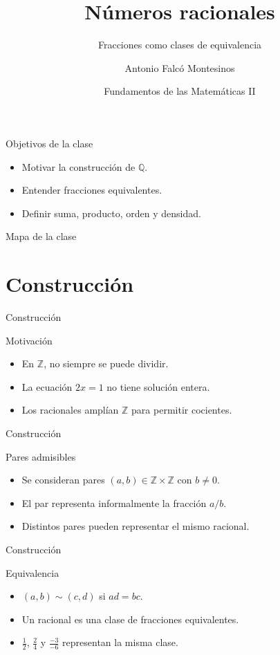 \documentclass[aspectratio=169,11pt]{beamer}
\title[FdM II -- Clase 12]{Números racionales}
\subtitle{Fracciones como clases de equivalencia}
\author{Antonio Falcó Montesinos}
\institute{Universidad CEU Cardenal Herrera}
\date{Fundamentos de las Matemáticas II}
\begin{document}
\begin{frame}
  \titlepage
\end{frame}

\begin{frame}{Objetivos de la clase}
\begin{itemize}
  \item Motivar la construcción de \(\mathbb{Q}\).
  \item Entender fracciones equivalentes.
  \item Definir suma, producto, orden y densidad.
\end{itemize}
\end{frame}

\begin{frame}{Mapa de la clase}
\tableofcontents
\end{frame}

\section{Construcción}

\begin{frame}{Construcción}
\begin{block}{Motivación}
\begin{itemize}
  \item En \(\mathbb{Z}\), no siempre se puede dividir.
  \item La ecuación \(2x=1\) no tiene solución entera.
  \item Los racionales amplían \(\mathbb{Z}\) para permitir cocientes.
\end{itemize}
\end{block}
\end{frame}

\begin{frame}{Construcción}
\begin{block}{Pares admisibles}
\begin{itemize}
  \item Se consideran pares \((a,b)\in\mathbb{Z}\times\mathbb{Z}\) con \(b\neq 0\).
  \item El par representa informalmente la fracción \(a/b\).
  \item Distintos pares pueden representar el mismo racional.
\end{itemize}
\end{block}
\end{frame}

\begin{frame}{Construcción}
\begin{block}{Equivalencia}
\begin{itemize}
  \item \((a,b)\sim(c,d)\) si \(ad=bc\).
  \item Un racional es una clase de fracciones equivalentes.
  \item \(\frac{1}{2}\), \(\frac{2}{4}\) y \(\frac{-3}{-6}\) representan la misma clase.
\end{itemize}
\end{block}
\end{frame}
\end{document}
